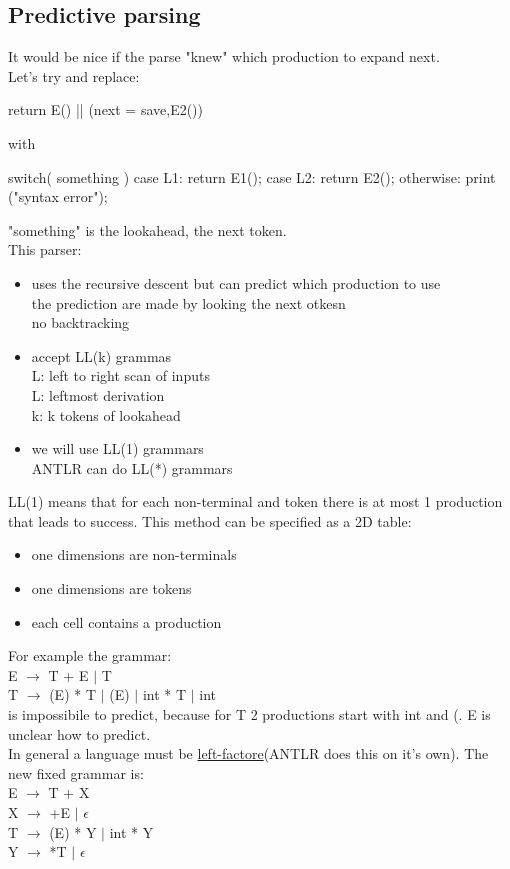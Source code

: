 \documentclass[12pt]{article}
\begin{document}
\subsection{Predictive parsing}
It would be nice if the parse "knew" which production to expand next. 
\\ Let's try and replace: 
\begin{mycode}
return E() || (next = save,E2()) 
\end{mycode}
with 
\begin{mycode}
switch( something ) {
    case L1: return E1();
    case L2: return E2();
    otherwise: print ("syntax error");
}
\end{mycode}
"something" is the lookahead, the next token.
\\ This parser: 
\begin{itemize}
    \item uses the recursive descent but can predict which production to use
        \\ the prediction are made by looking the next otkesn
        \\ no backtracking
    \item accept LL(k) grammas 
        \\ L: left to right scan of inputs
        \\ L: leftmost derivation
        \\ k: k tokens of lookahead
    \item we will use LL(1) grammars
        \\ ANTLR can do LL(*) grammars
\end{itemize}
LL(1) means that for each non-terminal and token there is at most 1 production that leads to success. 
This method can be specified as a 2D table: 
\begin{itemize}
    \item one dimensions are non-terminals
    \item one dimensions are tokens
    \item each cell contains a production
\end{itemize}
For example the grammar: 
\\ E $\rightarrow$ T + E $|$ T
\\ T $\rightarrow$ (E) * T $|$ (E) $|$ int * T $|$ int
\\ is impossibile to predict, because for T 2 productions start with int and (. E is unclear how to predict. 
\\ In general a language must be \underline{left-factore}(ANTLR does this on it's own).
The new fixed grammar is:
\\ E $\rightarrow$ T + X 
\\ X $\rightarrow$ +E $|$ $\epsilon$
\\ T $\rightarrow$ (E) * Y $|$ int * Y
\\ Y $\rightarrow$ *T $|$ $\epsilon$
\end{document}
